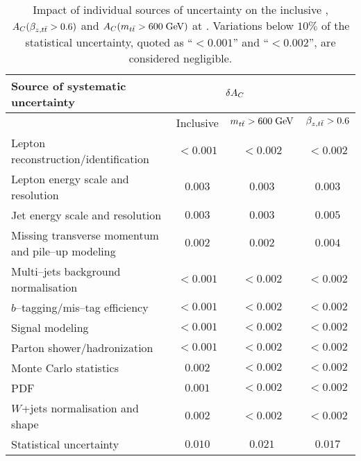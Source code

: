 \begin{table}[!htb]\centering
\begin{tabular}{l c c c}
\toprule
Source of systematic uncertainty  & \multicolumn{2}{c}{$\delta{\ensuremath{A_C}{}}$} \\
\midrule
  & Inclusive & $m_{t\bar{t}}{} >600\; \mathrm{GeV}{}$ & $\beta_{z,t\bar{t}}{}>0.6$ \\
\midrule
Lepton reconstruction/identification    & $<0.001$ & $<0.002$ & $<0.002$\\
Lepton energy scale and resolution      & $0.003$    & $0.003$   &  $0.003$\\
Jet energy scale and resolution             & $0.003$    & $0.003$   &
$0.005$ \\
Missing transverse momentum and pile--up modeling & $0.002$ & $0.002$
& $0.004$\\
Multi--jets background normalisation    & $<0.001$ & $<0.002$ & $<0.002$\\
$b$--tagging/mis--tag efficiency         & $<0.001$  & $<0.002$ & $<0.002$\\
Signal modeling                                       & $<0.001$ &
$<0.002$ & $<0.002$\\
Parton shower/hadronization             & $<0.001$  & $<0.002$ & $<0.002$\\
Monte Carlo statistics                         & $0.002$  & $<0.002$ & $<0.002$\\
PDF                                                      & $0.001$  & $<0.002$  & $<0.002$\\
$W$+jets normalisation and shape     & $0.002$  & $<0.002$ & $<0.002$\\
\midrule
Statistical uncertainty                          & $0.010$ & $0.021$ & $0.017$\\
\bottomrule
\end{tabular}
\caption{Impact of individual sources of uncertainty on the inclusive
  \ac{}, \mbox{$A_C{}(\beta_{z,t\bar{t}}{}>0.6)$} and \mbox{$A_C{}(m_{t\bar{t}}{}>600
    \; \mathrm{GeV}{})$} at \seventev{}. Variations below $10\%$ of the
  statistical uncertainty, quoted as ``$<0.001$'' and ``$<0.002$'',
  are considered negligible.}
\label{tab:systematics}
\end{table}

